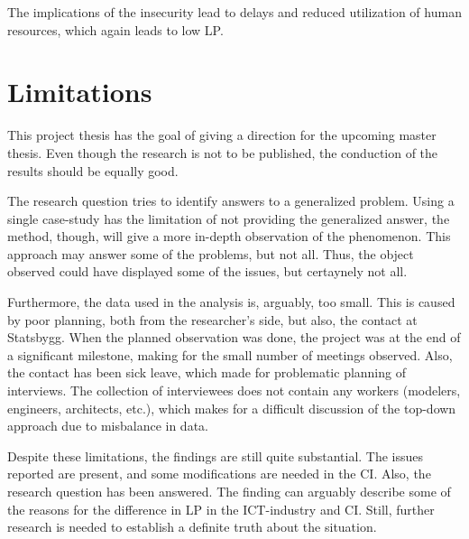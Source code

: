 The implications of the insecurity lead to delays and reduced utilization of human resources, which again leads to low LP.

\section{Limitations}
This project thesis has the goal of giving a direction for the upcoming master thesis. Even though the research is not to be published, the conduction of the results should be equally good. 

The research question tries to identify answers to a generalized problem. Using a single case-study has the limitation of not providing the generalized answer, the method, though, will give a more in-depth observation of the phenomenon. This approach may answer some of the problems, but not all. Thus, the object observed could have displayed some of the issues, but certaynely not all.

Furthermore, the data used in the analysis is, arguably, too small. This is caused by poor planning, both from the researcher's side, but also, the contact at Statsbygg. When the planned observation was done, the project was at the end of a significant milestone, making for the small number of meetings observed. Also, the contact has been sick leave, which made for problematic planning of interviews. The collection of interviewees does not contain any workers (modelers, engineers, architects, etc.), which makes for a difficult discussion of the top-down approach due to misbalance in data.

Despite these limitations, the findings are still quite substantial. The issues reported are present, and some modifications are needed in the CI. Also, the research question has been answered. The finding can arguably describe some of the reasons for the difference in LP in the ICT-industry and CI. Still, further research is needed to establish a definite truth about the situation.


\cleardoublepage
